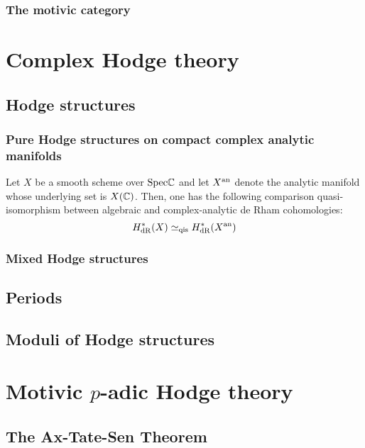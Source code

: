            \subsubsection{The motivic category}
    
    \section{Complex Hodge theory}
        \subsection{Hodge structures}
            \subsubsection{Pure Hodge structures on compact complex analytic manifolds}
                \begin{theorem} \label{theorem: de_rham_cohomology}
                    Let $X$ be a smooth scheme over $\mathrm{Spec} \mathbb{C}$ and let $X^{\mathrm{an}}$ denote the analytic manifold whose underlying set is $X(\mathbb{C})$. Then, one has the following comparison quasi-isomorphism between algebraic and complex-analytic de Rham cohomologies:
                        $$H^*_{\mathrm{dR}}(X) \simeq_{\mathrm{qis}} H^*_{\mathrm{dR}}(X^{\mathrm{an}})$$
                \end{theorem}
            
            \subsubsection{Mixed Hodge structures}
        
        \subsection{Periods}
        
        \subsection{Moduli of Hodge structures}
        
    \section{Motivic \texorpdfstring{$p$}{}-adic Hodge theory}
        \subsection{The Ax-Tate-Sen Theorem}
    

